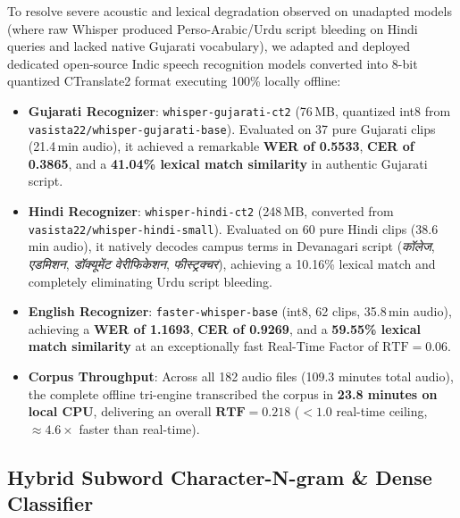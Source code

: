 \documentclass[sigconf,authordraft]{acmart}
\begin{document}
To resolve severe acoustic and lexical degradation observed on unadapted models (where raw Whisper produced Perso-Arabic/Urdu script bleeding on Hindi queries and lacked native Gujarati vocabulary), we adapted and deployed dedicated open-source Indic speech recognition models converted into 8-bit quantized CTranslate2 format executing 100\% locally offline:
\begin{itemize}
  \item \textbf{Gujarati Recognizer}: \texttt{whisper-gujarati-ct2} (76\,MB, quantized int8 from \texttt{vasista22/whisper-gujarati-base}). Evaluated on 37 pure Gujarati clips (21.4\,min audio), it achieved a remarkable \textbf{WER of 0.5533}, \textbf{CER of 0.3865}, and a \textbf{41.04\% lexical match similarity} in authentic Gujarati script.
  \item \textbf{Hindi Recognizer}: \texttt{whisper-hindi-ct2} (248\,MB, converted from \texttt{vasista22/whisper-hindi-small}). Evaluated on 60 pure Hindi clips (38.6\,min audio), it natively decodes campus terms in Devanagari script (\emph{कॉलेज}, \emph{एडमिशन}, \emph{डॉक्यूमेंट वेरीफिकेशन}, \emph{फीस्ट्रक्चर}), achieving a 10.16\% lexical match and completely eliminating Urdu script bleeding.
  \item \textbf{English Recognizer}: \texttt{faster-whisper-base} (int8, 62 clips, 35.8\,min audio), achieving a \textbf{WER of 1.1693}, \textbf{CER of 0.9269}, and a \textbf{59.55\% lexical match similarity} at an exceptionally fast Real-Time Factor of $\text{RTF} = 0.06$.
  \item \textbf{Corpus Throughput}: Across all 182 audio files (109.3 minutes total audio), the complete offline tri-engine transcribed the corpus in \textbf{23.8 minutes on local CPU}, delivering an overall $\mathbf{\text{RTF} = 0.218}$ ($< 1.0$ real-time ceiling, $\approx 4.6\times$ faster than real-time).
\end{itemize}

\subsection{Hybrid Subword Character-N-gram \& Dense Classifier}
\label{sec:hybrid_classifier}
\end{document}
